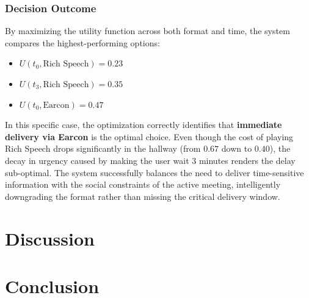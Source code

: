 \subsection{Decision Outcome}

By maximizing the utility function across both format and time, the system compares the highest-performing options:
\begin{itemize}
    \item $U(t_0, \text{Rich Speech}) = 0.23$
    \item $U(t_3, \text{Rich Speech}) = 0.35$
    \item $U(t_0, \text{Earcon}) = \mathbf{0.47}$
\end{itemize}

In this specific case, the optimization correctly identifies that \textbf{immediate delivery via Earcon} is the optimal choice. Even though the cost of playing Rich Speech drops significantly in the hallway (from $0.67$ down to $0.40$), the decay in urgency caused by making the user wait 3 minutes renders the delay sub-optimal. The system successfully balances the need to deliver time-sensitive information with the social constraints of the active meeting, intelligently downgrading the format rather than missing the critical delivery window.





\chapter{Discussion}

\chapter{Conclusion}
\label{sec:conclusion}

